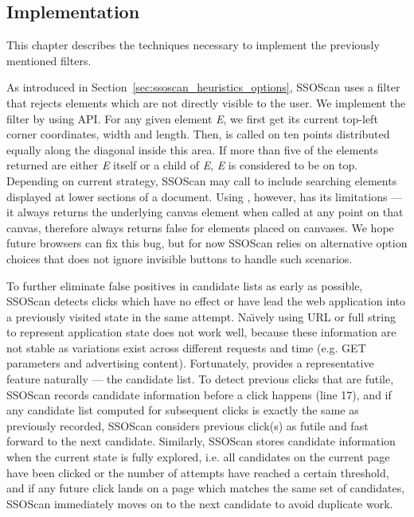 \subsection{Implementation}
\label{sec:ssoscan_heuristics_impl}

This chapter describes the techniques necessary to implement the previously mentioned filters.  

 As introduced in Section~\ref{sec:ssoscan_heuristics_options}, SSOScan uses a filter that rejects elements which are not directly visible to the user.  We implement the filter by using  API.  For any given element \emph{E}, we first get its current top-left corner coordinates, width and length.  Then,  is called on ten points distributed equally along the diagonal inside this area.  If more than five of the elements returned are either \emph{E} itself or a child of \emph{E}, \emph{E} is considered to be on top.  Depending on current strategy, SSOScan may call  to include searching elements displayed at lower sections of a document.  Using , however, has its limitations --- it always returns the underlying canvas element when called at any point on that canvas, therefore  always returns false for elements placed on canvases.  We hope future browsers can fix this bug, but for now SSOScan relies on alternative option choices that does not ignore invisible buttons to handle such scenarios.

 To further eliminate false positives in candidate lists as early as possible, SSOScan detects clicks which have no effect or have lead the web application into a previously visited state in the same attempt.  Na\"{\i}vely using URL or full  string to represent application state does not work well, because these information are not stable as variations exist across different requests and time (e.g. GET parameters and advertising content).  Fortunately,  provides a representative feature naturally --- the candidate list.  To detect previous clicks that are futile, SSOScan records candidate information before a click happens (line 17), and if any candidate list computed for subsequent clicks is exactly the same as previously recorded, SSOScan considers previous click(s) as futile and fast forward to the next candidate.  Similarly, SSOScan stores candidate information when the current state is fully explored, i.e. all candidates on the current page have been clicked or the number of attempts have reached a certain threshold, and if any future click lands on a page which matches the same set of candidates, SSOScan immediately moves on to the next candidate to avoid duplicate work.

